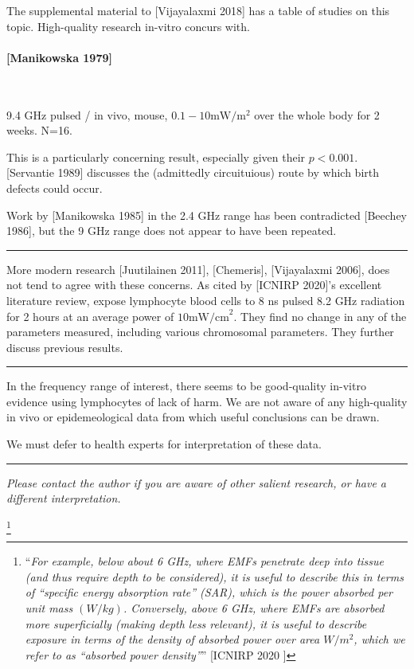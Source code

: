 \documentclass[fleqn,10pt]{article}
\begin{document}
\begin{multicols}{1}
The supplemental material to [Vijayalaxmi 2018] has a table of studies on this topic. High-quality research in-vitro concurs with.

\paragraph{[Manikowska 1979]} \

9.4 GHz pulsed / in vivo, mouse, $0.1-10 \text{mW}/\text{m}^2$ over the whole body for 2 weeks. N=16.

This is a particularly concerning result, especially given their $p<0.001$. [Servantie 1989] discusses the (admittedly circuituious) route by which birth defects could occur.

Work by [Manikowska 1985] in the 2.4 GHz range has been contradicted [Beechey 1986], but the 9 GHz range does not appear to have been repeated.

\rule{\linewidth}{0.2pt}

More modern research [Juutilainen 2011], [Chemeris], [Vijayalaxmi 2006],  does not tend to agree with these concerns. As cited by [ICNIRP 2020]'s excellent literature review, expose lymphocyte blood cells to 8 ns pulsed 8.2 GHz radiation for 2 hours at an average power of $10 \text{mW/cm}^2$. They find no change in any of the parameters measured, including various chromosomal parameters. They further discuss previous results.

\rule{\linewidth}{0.2pt}

In the frequency range of interest, there seems to be good-quality in-vitro evidence using lymphocytes of lack of harm. We are not aware of any high-quality in vivo or epidemeological data from which useful conclusions can be drawn. 

We must defer to health experts for interpretation of these data.

\rule{\linewidth}{0.2pt}

{\it Please contact the author if you are aware of other salient research, or have a different interpretation.}

\footnote{``{\it{For example, below about 6 GHz, where EMFs penetrate deep into tissue (and thus require depth to be considered), it is useful to describe this in terms of “specific energy absorption rate” (SAR), which is the power absorbed per unit mass $(W/kg)$. Conversely, above 6 GHz, where EMFs are absorbed more superficially (making depth less relevant), it is useful to describe exposure in terms of the density of absorbed power over area $W/m^2$, which we refer to as “absorbed power density”}}'' [ICNIRP 2020 \faExternalLink]}

\end{multicols}
\end{document}
